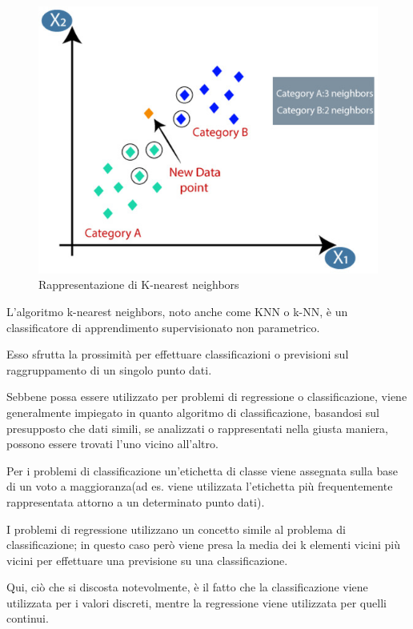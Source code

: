 \begin{figure}
    \begin{center}    
        \includegraphics[width=0.9\linewidth]{images/image11.jpeg}
        \caption{Rappresentazione di K-nearest neighbors}
    \end{center}
\end{figure}

L'algoritmo k-nearest neighbors, noto anche come KNN o k-NN, è un classificatore di apprendimento supervisionato non parametrico.

Esso sfrutta la prossimità per effettuare classificazioni o previsioni sul raggruppamento di un singolo punto dati. 

Sebbene possa essere utilizzato per problemi di regressione o classificazione, viene generalmente impiegato in quanto algoritmo di classificazione, basandosi sul presupposto che dati simili, se analizzati o rappresentati nella giusta maniera, possono essere trovati l'uno vicino all'altro.

Per i problemi di classificazione un'etichetta di classe viene assegnata sulla base di un voto a maggioranza(ad es. viene utilizzata l'etichetta più frequentemente rappresentata attorno a un determinato punto dati).

I problemi di regressione utilizzano un concetto simile al problema di classificazione; in questo caso però viene presa la media dei k elementi vicini più vicini per effettuare una previsione su una classificazione. 

Qui, ciò che si discosta notevolmente, è il fatto che la classificazione viene utilizzata per i valori discreti, mentre la regressione viene utilizzata per quelli continui. 

